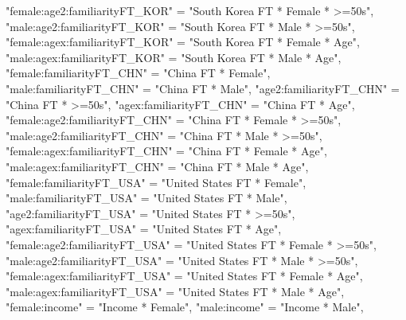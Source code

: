 \documentclass[
]{article}
\newenvironment{Shaded}{\begin{snugshade}}{\end{snugshade}}
\newcommand{\NormalTok}[1]{#1}
\newcommand{\StringTok}[1]{\textcolor[rgb]{0.31,0.60,0.02}{#1}}
\begin{document}
\begin{Shaded}
\begin{Highlighting}[]
              \StringTok{"female:age2:familiarityFT_KOR"}\NormalTok{ =}\StringTok{ "South Korea FT * Female * >=50s"}\NormalTok{,}
              \StringTok{"male:age2:familiarityFT_KOR"}\NormalTok{ =}\StringTok{ "South Korea FT * Male * >=50s"}\NormalTok{,}
              \StringTok{"female:agex:familiarityFT_KOR"}\NormalTok{ =}\StringTok{ "South Korea FT * Female * Age"}\NormalTok{,}
              \StringTok{"male:agex:familiarityFT_KOR"}\NormalTok{ =}\StringTok{ "South Korea FT * Male * Age"}\NormalTok{,}
              \StringTok{"female:familiarityFT_CHN"}\NormalTok{ =}\StringTok{ "China FT * Female"}\NormalTok{,}
              \StringTok{"male:familiarityFT_CHN"}\NormalTok{ =}\StringTok{ "China FT * Male"}\NormalTok{,}
              \StringTok{"age2:familiarityFT_CHN"}\NormalTok{ =}\StringTok{ "China FT * >=50s"}\NormalTok{,}
              \StringTok{"agex:familiarityFT_CHN"}\NormalTok{ =}\StringTok{ "China FT * Age"}\NormalTok{,}
              \StringTok{"female:age2:familiarityFT_CHN"}\NormalTok{ =}\StringTok{ "China FT * Female * >=50s"}\NormalTok{,}
              \StringTok{"male:age2:familiarityFT_CHN"}\NormalTok{ =}\StringTok{ "China FT * Male * >=50s"}\NormalTok{,}
              \StringTok{"female:agex:familiarityFT_CHN"}\NormalTok{ =}\StringTok{ "China FT * Female * Age"}\NormalTok{,}
              \StringTok{"male:agex:familiarityFT_CHN"}\NormalTok{ =}\StringTok{ "China FT * Male * Age"}\NormalTok{,}
              \StringTok{"female:familiarityFT_USA"}\NormalTok{ =}\StringTok{ "United States FT * Female"}\NormalTok{,}
              \StringTok{"male:familiarityFT_USA"}\NormalTok{ =}\StringTok{ "United States FT * Male"}\NormalTok{,}
              \StringTok{"age2:familiarityFT_USA"}\NormalTok{ =}\StringTok{ "United States FT * >=50s"}\NormalTok{,}
              \StringTok{"agex:familiarityFT_USA"}\NormalTok{ =}\StringTok{ "United States FT * Age"}\NormalTok{,}
              \StringTok{"female:age2:familiarityFT_USA"}\NormalTok{ =}\StringTok{ "United States FT * Female * >=50s"}\NormalTok{,}
              \StringTok{"male:age2:familiarityFT_USA"}\NormalTok{ =}\StringTok{ "United States FT * Male * >=50s"}\NormalTok{,}
              \StringTok{"female:agex:familiarityFT_USA"}\NormalTok{ =}\StringTok{ "United States FT * Female * Age"}\NormalTok{,}
              \StringTok{"male:agex:familiarityFT_USA"}\NormalTok{ =}\StringTok{ "United States FT * Male * Age"}\NormalTok{,}
              \StringTok{"female:income"}\NormalTok{ =}\StringTok{ "Income * Female"}\NormalTok{,}
              \StringTok{"male:income"}\NormalTok{ =}\StringTok{ "Income * Male"}\NormalTok{,}

\end{Highlighting}
\end{Shaded}
\end{document}
